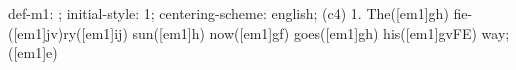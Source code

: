 def-m1: \grealign;
initial-style: 1;
centering-scheme: english;
(c4) 1. The([em1]gh) fie-([em1]jv)ry([em1]ij) sun([em1]h) now([em1]gf) goes([em1]gh) his([em1]gvFE) way;([em1]e)